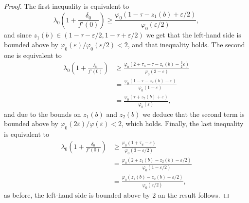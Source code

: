 \documentclass[a4paper,11pt]{article}
\theoremstyle{plain}
\theoremstyle{definition}
\theoremstyle{definition}
\numberwithin{equation}{section}
\begin{document}
\begin{proof}
The first inequality is equivalent to
\[
    \lambda_0\left( 1+\frac{\delta_0}{f'(0)} \right) \geq \frac{\varphi_0(1-\tau-z_1(b) + \varepsilon/2)}{ \varphi_0(\varepsilon/2)},
\]
and since $z_1(b)\in (1-\tau-\varepsilon/2, 1-\tau+\varepsilon/2)$ we get that the left-hand side is bounded above by $\varphi_0(\varepsilon)/\varphi_0(\varepsilon/2)<2$, and that inequality holds. The second one is equivalent to
\begin{align*}
    \lambda_0\left( 1+\frac{\delta_0}{f'(0)} \right) &\geq \frac{\varphi_0(2+\tau_u-\tau-z_1(b)-\frac{3}{2}\varepsilon)}{\varphi_0(3-\varepsilon)} \\
    &= \frac{\varphi_0(1-\tau-z_2(b)-\varepsilon)}{\varphi_0(1-\varepsilon)} \\
    &= \frac{\varphi_0(\tau+z_2(b)+\varepsilon)}{\varphi_0(\varepsilon)},
\end{align*}
and due to the bounds on $z_1(b)$ and $z_2(b)$ we deduce that the second term is bounded above by $\varphi_0(2\varepsilon)/\varphi(\varepsilon)<2$, which holds. Finally, the last inequality is equivalent to
\begin{align*}
    \lambda_0\left( 1+\frac{\delta_0}{f'(0)} \right) &\geq \frac{\varphi_0(1+\tau_u-\varepsilon)}{\varphi_0(3-\varepsilon/2)} \\
    &= \frac{\varphi_0(2+z_1(b)-z_2(b)-\varepsilon/2)}{\varphi_0(1-\varepsilon/2)} \\
    &= \frac{\varphi_0(z_1(b)-z_2(b)-\varepsilon/2)}{\varphi_0(\varepsilon/2)},
\end{align*}
as before, the left-hand side is bounded above by 2 an the result follows. 


\end{proof}
\end{document}
